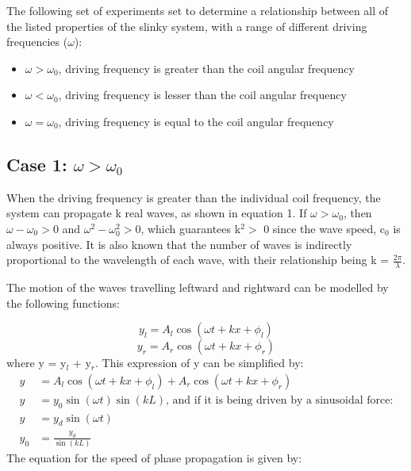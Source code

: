 \documentclass[12pt, letterpaper, twoside]{article}
\begin{document}
The following set of experiments set to determine a relationship between all of the listed properties of the slinky system, with a range of different driving frequencies ($\omega$):

\begin{itemize}
    \item $\omega > \omega_0$, driving frequency is greater than the coil angular frequency
    \item $\omega < \omega_0$, driving frequency is lesser than the coil angular frequency
    \item $\omega = \omega_0$, driving frequency is equal to the coil angular frequency
\end{itemize}

\subsection{Case 1: $\omega > \omega_0$}

When the driving frequency is greater than the individual coil frequency, the system can propagate k real waves, as shown in equation 1. If $\omega > \omega_0$, then $\omega - \omega_0 > 0$ and $\omega^2 - \omega_0^2 > 0$, which guarantees k$^2 >$ 0 since the wave speed, c$_0$ is always positive. It is also known that the number of waves is indirectly proportional to the wavelength of each wave, with their relationship being k = $\frac{2\pi}{\lambda}$.

The motion of the waves travelling leftward and rightward can be modelled by the following functions:

\begin{equation*}
    y_l = A_l\cos{(\omega t + kx + \phi_l)}    
\end{equation*}
\begin{equation*}
    y_r = A_r\cos{(\omega t + kx + \phi_r)}    
\end{equation*}
where y = y$_l$ + y$_r$. This expression of y can be simplified by:
\begin{align*}
    y &= A_l\cos{(\omega t + kx + \phi_l)} + A_r\cos{(\omega t + kx + \phi_r)} \\
    y &= y_0\sin{(\omega t)}\sin{(kL)} \text{, and if it is being driven by a sinusoidal force:} \\
    y &= y_d\sin{(\omega t)} \\
    y_0 &= \frac{y_d}{\sin{(kL)}}
\end{align*}
The equation for the speed of phase propagation is given by:
\end{document}
